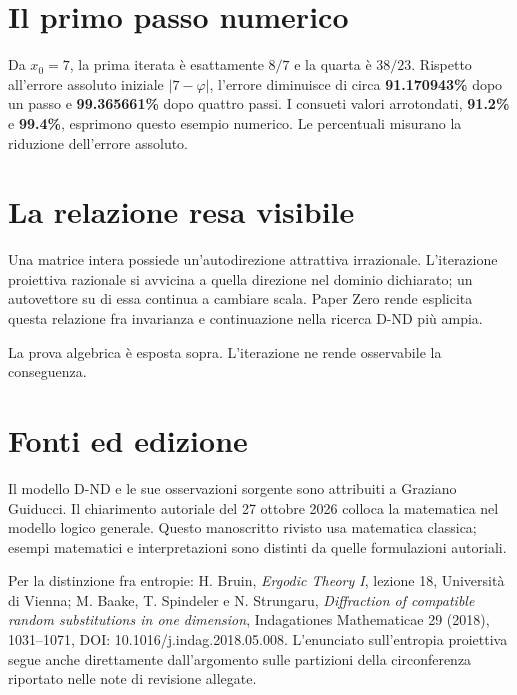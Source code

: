 \documentclass[10pt,a4paper]{article}
\begin{document}
\section*{Il primo passo numerico}

Da $x_0=7$, la prima iterata è esattamente $8/7$ e la quarta è $38/23$. Rispetto all'errore assoluto iniziale $|7-\varphi|$, l'errore diminuisce di circa \textbf{91.170943\%} dopo un passo e \textbf{99.365661\%} dopo quattro passi. I consueti valori arrotondati, \textbf{91.2\%} e \textbf{99.4\%}, esprimono questo esempio numerico. Le percentuali misurano la riduzione dell'errore assoluto.
\par

\section*{La relazione resa visibile}

Una matrice intera possiede un'autodirezione attrattiva irrazionale. L'iterazione proiettiva razionale si avvicina a quella direzione nel dominio dichiarato; un autovettore su di essa continua a cambiare scala. Paper Zero rende esplicita questa relazione fra invarianza e continuazione nella ricerca D-ND più ampia.
\par

La prova algebrica è esposta sopra. L'iterazione ne rende osservabile la conseguenza.
\par

\section*{Fonti ed edizione}

Il modello D-ND e le sue osservazioni sorgente sono attribuiti a Graziano Guiducci. Il chiarimento autoriale del 27 ottobre 2026 colloca la matematica nel modello logico generale. Questo manoscritto rivisto usa matematica classica; esempi matematici e interpretazioni sono distinti da quelle formulazioni autoriali.
\par

Per la distinzione fra entropie: H. Bruin, \emph{Ergodic Theory I}, lezione 18, Università di Vienna; M. Baake, T. Spindeler e N. Strungaru, \emph{Diffraction of compatible random substitutions in one dimension}, Indagationes Mathematicae 29 (2018), 1031--1071, DOI: 10.1016/j.indag.2018.05.008. L'enunciato sull'entropia proiettiva segue anche direttamente dall'argomento sulle partizioni della circonferenza riportato nelle note di revisione allegate.
\par
\end{document}
